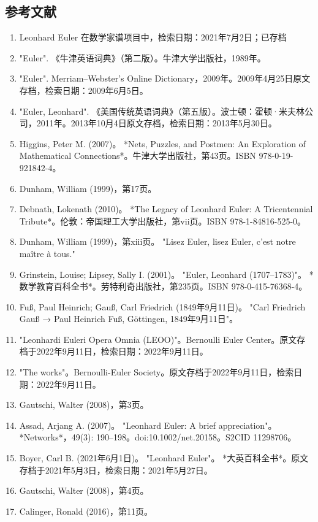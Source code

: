 \subsection{参考文献}
\begin{enumerate}
\item Leonhard Euler 在数学家谱项目中，检索日期：2021年7月2日；已存档  
\item "Euler". 《牛津英语词典》（第二版）。牛津大学出版社，1989年。  
\item "Euler". Merriam–Webster's Online Dictionary，2009年。2009年4月25日原文存档，检索日期：2009年6月5日。  
\item "Euler, Leonhard". 《美国传统英语词典》（第五版）。波士顿：霍顿·米夫林公司，2011年。2013年10月4日原文存档，检索日期：2013年5月30日。  
\item Higgins, Peter M. (2007)。 *Nets, Puzzles, and Postmen: An Exploration of Mathematical Connections*。牛津大学出版社，第43页。ISBN 978-0-19-921842-4。  
\item Dunham, William (1999)，第17页。  
\item Debnath, Lokenath (2010)。 *The Legacy of Leonhard Euler: A Tricentennial Tribute*。伦敦：帝国理工大学出版社，第vii页。ISBN 978-1-84816-525-0。  
\item Dunham, William (1999)，第xiii页。 "Lisez Euler, lisez Euler, c'est notre maître à tous."  
\item Grinstein, Louise; Lipsey, Sally I. (2001)。 "Euler, Leonhard (1707–1783)"。 *数学教育百科全书*。劳特利奇出版社，第235页。ISBN 978-0-415-76368-4。  
\item Fuß, Paul Heinrich; Gauß, Carl Friedrich (1849年9月11日)。 "Carl Friedrich Gauß → Paul Heinrich Fuß, Göttingen, 1849年9月11日"。
\item "Leonhardi Euleri Opera Omnia (LEOO)"。Bernoulli Euler Center。原文存档于2022年9月11日，检索日期：2022年9月11日。  
\item "The works"。Bernoulli-Euler Society。原文存档于2022年9月11日，检索日期：2022年9月11日。  
\item Gautschi, Walter (2008)，第3页。  
\item Assad, Arjang A. (2007)。 "Leonhard Euler: A brief appreciation"。 *Networks*，49(3): 190–198。doi:10.1002/net.20158。S2CID 11298706。  
\item Boyer, Carl B. (2021年6月1日)。 "Leonhard Euler"。 *大英百科全书*。原文存档于2021年5月3日，检索日期：2021年5月27日。  
\item Gautschi, Walter (2008)，第4页。  
\item Calinger, Ronald (2016)，第11页。  

\end{enumerate}
